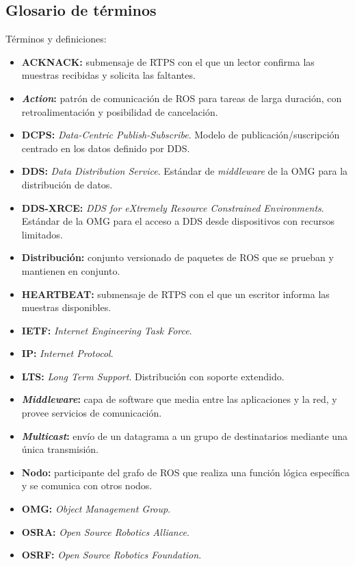 \documentclass[DOC]{UTNLSE}
\begin{document}
\subsection{Glosario de términos}
Términos y definiciones:
\begin{itemize}
    \item \textbf{ACKNACK:} submensaje de RTPS con el que un lector confirma las
    muestras recibidas y solicita las faltantes.
    \item \textbf{\textit{Action}:} patrón de comunicación de ROS para tareas
    de larga duración, con retroalimentación y posibilidad de cancelación.
    \item \textbf{DCPS:} \textit{Data-Centric Publish-Subscribe}. Modelo de
    publicación/suscripción centrado en los datos definido por DDS.
    \item \textbf{DDS:} \textit{Data Distribution Service}. Estándar de
    \textit{middleware} de la OMG para la distribución de datos.
    \item \textbf{DDS-XRCE:} \textit{DDS for eXtremely Resource Constrained
    Environments}. Estándar de la OMG para el acceso a DDS desde dispositivos
    con recursos limitados.
    \item \textbf{Distribución:} conjunto versionado de paquetes de ROS que se
    prueban y mantienen en conjunto.
    \item \textbf{HEARTBEAT:} submensaje de RTPS con el que un escritor
    informa las muestras disponibles.
    \item \textbf{IETF:} \textit{Internet Engineering Task Force}.
    \item \textbf{IP:} \textit{Internet Protocol}.
    \item \textbf{LTS:} \textit{Long Term Support}. Distribución con soporte
    extendido.
    \item \textbf{\textit{Middleware}:} capa de software que media entre las
    aplicaciones y la red, y provee servicios de comunicación.
    \item \textbf{\textit{Multicast}:} envío de un datagrama a un grupo de
    destinatarios mediante una única transmisión.
    \item \textbf{Nodo:} participante del grafo de ROS que realiza una función
    lógica específica y se comunica con otros nodos.
    \item \textbf{OMG:} \textit{Object Management Group}.
    \item \textbf{OSRA:} \textit{Open Source Robotics Alliance}.
    \item \textbf{OSRF:} \textit{Open Source Robotics Foundation}.

\end{itemize}
\end{document}
